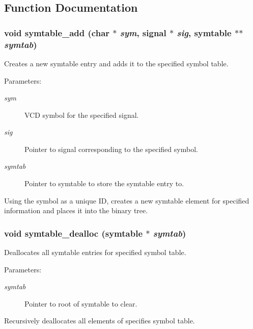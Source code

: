 \subsection{Function Documentation}
\subsubsection{\setlength{\rightskip}{0pt plus 5cm}void symtable\_\-add (char $\ast$ {\em sym}, {\bf signal} $\ast$ {\em sig}, {\bf symtable} $\ast$$\ast$ {\em symtab})}\label{symtable_8c_a0}


Creates a new symtable entry and adds it to the specified symbol table.

\begin{Desc}
\item[Parameters: ]\par
\begin{description}
\item[{\em 
sym}]VCD symbol for the specified signal. \item[{\em 
sig}]Pointer to signal corresponding to the specified symbol. \item[{\em 
symtab}]Pointer to symtable to store the symtable entry to.\end{description}
\end{Desc}
Using the symbol as a unique ID, creates a new symtable element for specified information and places it into the binary tree. 
\subsubsection{\setlength{\rightskip}{0pt plus 5cm}void symtable\_\-dealloc ({\bf symtable} $\ast$ {\em symtab})}\label{symtable_8c_a2}


Deallocates all symtable entries for specified symbol table.

\begin{Desc}
\item[Parameters: ]\par
\begin{description}
\item[{\em 
symtab}]Pointer to root of symtable to clear.\end{description}
\end{Desc}
Recursively deallocates all elements of specifies symbol table. 
